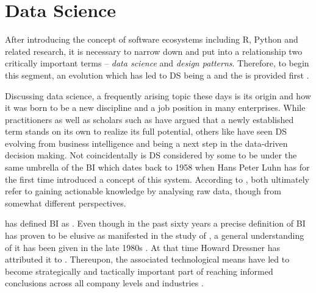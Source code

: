 \section{Data Science}
\label{termsDef}
After introducing the concept of software ecosystems including R, Python and related research, it is necessary to narrow down and put into a relationship two critically important terms -- \emph{data science} and \emph{design patterns}.
Therefore, to begin this segment, an evolution which has led to \ac{DS} being a  and the  is provided first \parencites{Davenport2012DataCentury}[51]{Provost201351}.

Discussing data science, a frequently arising topic these days is its origin and how it was born to be a new discipline and a job position in many enterprises.
While practitioners as well as scholars such as \textcites{Provost201351}{Carbone2016ChallengesPerspective} have argued that a newly established term stands on its own to realize its full potential, others like \textcites{Larson2016AScience}{Vasconcelos2017} have seen \ac{DS} evolving from business intelligence and being a next step in the data-driven decision making.
Not coincidentally is \ac{DS} considered by some to be under the same umbrella of the \ac{BI} which dates back to 1958 when Hans Peter Luhn has for the first time introduced a concept of this system.
According to \textcites{DavidRostcheck2016DataCareer}{Chen2012}, both ultimately refer to gaining actionable knowledge by analysing raw data, though from somewhat different perspectives.

\textcite[314]{5392644} has defined \ac{BI} as .
Even though in the past sixty years a precise definition of \ac{BI} has proven to be elusive as manifested in the study of \textcite{Al-Eisawi2012BusinessReview}, a general understanding of it has been given in the late 1980s \parencite{Tutunea2015BusinessOverview}.
At that time Howard Dressner has attributed it to  \parencite[176]{Negash2008}.
Thereupon, the associated technological means have led to become strategically and tactically important part of reaching informed conclusions across all company levels and industries \parencite{ArnottDAvidBIPat2017}. 

